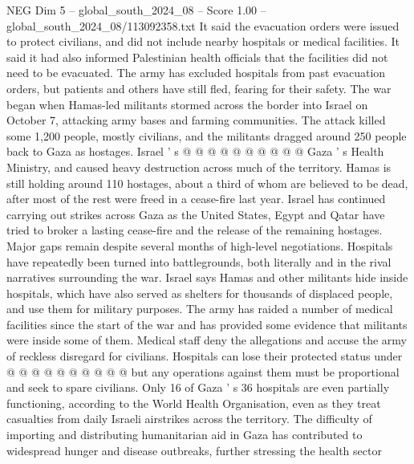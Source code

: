 \begin{textsample}{NEG Dim 5 – global\_south\_2024\_08 – Score 1.00 – global\_south\_2024\_08/113092358.txt}
It said the evacuation orders were issued to protect civilians, and did not include nearby hospitals or medical facilities.
It said it had also informed Palestinian health officials that the facilities did not need to be evacuated.
The army has excluded hospitals from past evacuation orders, but patients and others have still fled, fearing for their safety.
The war began when Hamas-led militants stormed across the border into Israel on October 7, attacking army bases and farming communities.
The attack killed some 1,200 people, mostly civilians, and the militants dragged around 250 people back to Gaza as hostages.
Israel ' s @ @ @ @ @ @ @ @ @ @ Gaza ' s Health Ministry, and caused heavy destruction across much of the territory.
Hamas is still holding around 110 hostages, about a third of whom are believed to be dead, after most of the rest were freed in a cease-fire last year.
Israel has continued carrying out strikes across Gaza as the United States, Egypt and Qatar have tried to broker a lasting cease-fire and the release of the remaining hostages.
Major gaps remain despite several months of high-level negotiations.
Hospitals have repeatedly been turned into battlegrounds, both literally and in the rival narratives surrounding the war.
Israel says Hamas and other militants hide inside hospitals, which have also served as shelters for thousands of displaced people, and use them for military purposes.
The army has raided a number of medical facilities since the start of the war and has provided some evidence that militants were inside some of them.
Medical staff deny the allegations and accuse the army of reckless disregard for civilians.
Hospitals can lose their protected status under @ @ @ @ @ @ @ @ @ @ but any operations against them must be proportional and seek to spare civilians.
Only 16 of Gaza ' s 36 hospitals are even partially functioning, according to the World Health Organisation, even as they treat casualties from daily Israeli airstrikes across the territory.
The difficulty of importing and distributing humanitarian aid in Gaza has contributed to widespread hunger and disease outbreaks, further stressing the health sector

\end{textsample}
